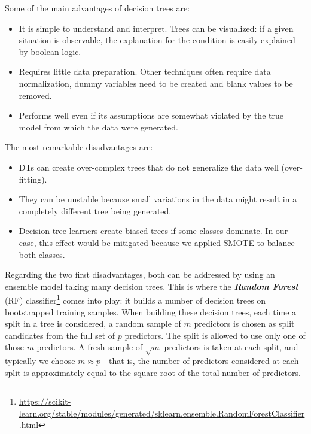 \documentclass[a4paper, 12pt]{book}
\begin{document}


Some of the main advantages of decision trees are:
\begin{itemize}
    \item It is simple to understand and interpret. Trees can be visualized: if a given situation is observable, the explanation for the condition is easily explained by boolean logic.
    \item Requires little data preparation. Other techniques often require data normalization, dummy variables need to be created and blank values to be removed.
    \item Performs well even if its assumptions are somewhat violated by the true model from which the data were generated.
\end{itemize} 

The most remarkable disadvantages are:
\begin{itemize}
    \item DTs can create over-complex trees that do not generalize the data well (over-fitting).
    \item They can be unstable because small variations in the data might result in a completely different tree being generated.
    \item Decision-tree learners create biased trees if some classes dominate. In our case, this effect would be mitigated because we applied SMOTE to balance both classes.
\end{itemize}

Regarding the two first disadvantages, both can be addressed by using an ensemble model taking
many decision trees. This is where the \textbf{\textit{Random Forest}} (RF) classifier\footnote{\url{https://scikit-learn.org/stable/modules/generated/sklearn.ensemble.RandomForestClassifier.html}}
comes into play: it builds a number of decision trees on bootstrapped training samples. When building
these decision trees, each time a split in a tree is considered, a random sample of $m$ predictors is 
chosen as split candidates from the full set of $p$ predictors. The split is allowed to use only one of 
those $m$ predictors. A fresh sample of $\sqrt{m}$ predictors is taken at each split, and typically
we choose $m \approx p$—that is, the number of predictors considered at each split is approximately
equal to the square root of the total number of predictors.
\end{document}
